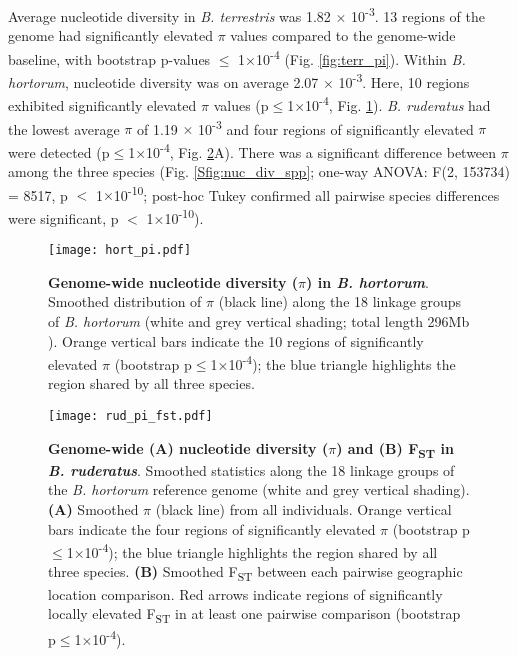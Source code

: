 \documentclass[12pt]{article}
\begin{document}
\begin{linenumbers}
    Average nucleotide diversity in \emph{B. terrestris} was 1.82 $\times$ 10\textsuperscript{-3}. 13 regions of the genome had significantly elevated $\pi$ values compared to the genome-wide baseline, with bootstrap p-values $\leq$ 1$\times$10\textsuperscript{-4} (Fig. \ref{fig:terr_pi}). 
    Within \emph{B. hortorum}, nucleotide diversity was on average 2.07 $\times$ 10\textsuperscript{-3}. Here, 10 regions exhibited significantly elevated $\pi$ values (p$\leq$1$\times$10\textsuperscript{-4}, Fig. \ref{fig:hort_pi}). 
    \emph{B. ruderatus} had the lowest average $\pi$ of 1.19 $\times$ 10\textsuperscript{-3} and four regions of significantly elevated $\pi$ were detected (p$\leq$1$\times$10\textsuperscript{-4}, Fig. \ref{fig:rud_pi_fst}A).
    There was a significant difference between $\pi$ among the three species (Fig. \ref{Sfig:nuc_div_spp}; one-way ANOVA: F(2, 153734) = 8517, p $<$ 1$\times$10\textsuperscript{-10}; post-hoc Tukey confirmed all pairwise species differences were significant, p $<$ 1$\times$10\textsuperscript{-10}). 
    	
    
		\begin{figure}[ht!]
			\centering
			\texttt{[image: hort\_pi.pdf]}
			\captionsetup{width=0.88\linewidth}
			\caption{\textbf{Genome-wide nucleotide diversity ($\pi$) in \emph{B. hortorum}}. Smoothed distribution of $\pi$ (black line) along the 18 linkage groups of \emph{B. hortorum} (white and grey vertical shading; total length 296Mb \citep{ncbi_iybomhort11_2021}). Orange vertical bars indicate the 10 regions of significantly elevated $\pi$ (bootstrap p$\leq$1$\times$10\textsuperscript{-4}); the blue triangle highlights the region shared by all three species.}
			\label{fig:hort_pi}
		\end{figure}

		\begin{figure}[ht!]
			\centering
			\texttt{[image: rud\_pi\_fst.pdf]}
			\captionsetup{width=0.88\linewidth}
			\caption{\textbf{Genome-wide (A) nucleotide diversity ($\pi$) and (B) F\textsubscript{ST} in \emph{B. ruderatus}}. Smoothed statistics along the 18 linkage groups of the \emph{B. hortorum} reference genome (white and grey vertical shading). \textbf{(A)} Smoothed $\pi$ (black line) from all individuals. Orange vertical bars indicate the four regions of significantly elevated $\pi$ (bootstrap p$\leq$1$\times$10\textsuperscript{-4}); the blue triangle highlights the region shared by all three species. \textbf{(B)} Smoothed F\textsubscript{ST} between each pairwise geographic location comparison. Red arrows indicate regions of significantly locally elevated F\textsubscript{ST} in at least one pairwise comparison (bootstrap p$\leq$1$\times$10\textsuperscript{-4}).}
			\label{fig:rud_pi_fst}
		\end{figure}


\end{linenumbers}
\end{document}
